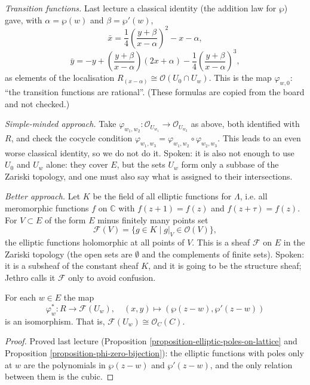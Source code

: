 \textit{Transition functions.} Last lecture a
classical identity (the addition law for
$\wp$) gave, with $\alpha=\wp(w)$ and
$\beta=\wp'(w)$,
$$
\bar x=\frac{1}{4}\left(\frac{y+\beta}
{x-\alpha}\right)^2-x-\alpha,
$$
$$
\bar
y=-y+\left(\frac{y+\beta}{x-\alpha}\right)
(2x+\alpha)
-\frac{1}{4}\left(\frac{y+\beta}{x-\alpha}
\right)^3,
$$
as elements of the localisation
$R_{(x-\alpha)}\cong\mathcal{O}(U_0\cap
U_w)$. This is the map $\varphi_{w,0}$: ``the
transition functions are rational''. (These
formulas are copied from the board and not
checked.)

\textit{Simple-minded approach.} Take
$\varphi_{w_1,w_2}\colon\mathcal{O}_{U_{w_1}}
\to\mathcal{O}_{U_{w_2}}$ as above, both
identified with $R$, and check the cocycle
condition
$\varphi_{w_1,w_3}=\varphi_{w_1,w_2}\circ
\varphi_{w_2,w_3}$. This leads to an even
worse classical identity, so we do not do it.
Spoken: it is also not enough to use $U_0$
and $U_w$ alone: they cover $E$, but the sets
$U_w$ form only a subbase of the Zariski
topology, and one must also say what is
assigned to their intersections.

\textit{Better approach.} Let $K$ be the
field of all elliptic functions for
$\Lambda$, i.e. all meromorphic functions $f$
on $\mathbb{C}$ with $f(z+1)=f(z)$ and
$f(z+\tau)=f(z)$. For $V\subset E$ of the
form $E$ minus finitely many points set
$$
\mathcal{F}(V)=\{g\in K\mid
g|_V\in\mathcal{O}(V)\},
$$
the elliptic functions holomorphic at all
points of $V$. This is a sheaf $\mathcal{F}$
on $E$ in the Zariski topology (the open sets
are $\emptyset$ and the complements of finite
sets). Spoken: it is a subsheaf of the
constant sheaf $K$, and it is going to be the
structure sheaf; Jethro calls it
$\mathcal{F}$ only to avoid confusion.

\begin{proposition}
\label{proposition-jethro-2026-11-04-chart}
For each $w\in E$ the map
$$
\varphi_w^*\colon R\to\mathcal{F}(U_w),\quad
(x,y)\mapsto(\wp(z-w),\wp'(z-w))
$$
is an isomorphism. That is,
$\mathcal{F}(U_w)\cong\mathcal{O}_C(C)$.
\end{proposition}

\begin{proof}
Proved last lecture (Proposition
\ref{proposition-elliptic-poles-on-lattice}
and Proposition
\ref{proposition-phi-zero-bijection}): the
elliptic functions
with poles only at $w$ are the polynomials in
$\wp(z-w)$ and $\wp'(z-w)$, and the only
relation between them is the cubic.
\end{proof}

